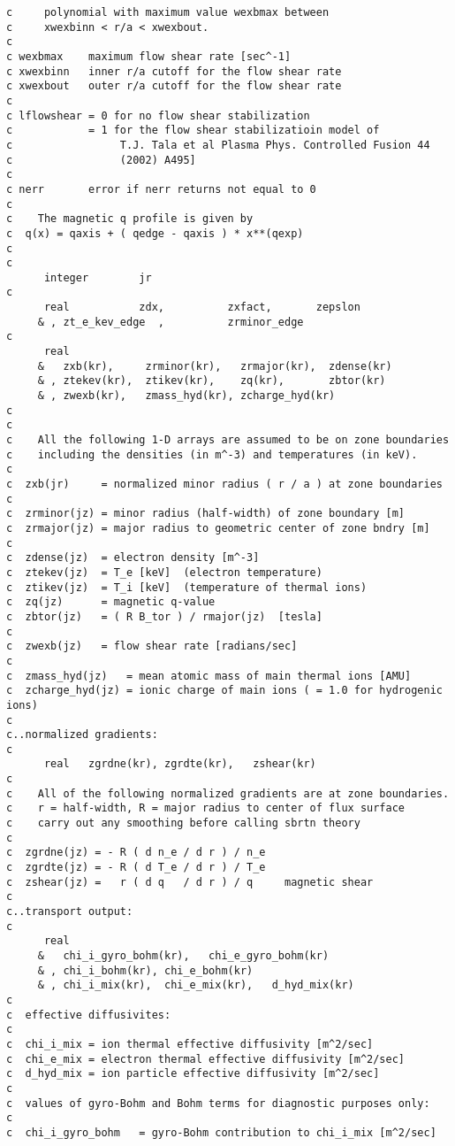 \begin{verbatim}
c     polynomial with maximum value wexbmax between
c     xwexbinn < r/a < xwexbout.
c
c wexbmax    maximum flow shear rate [sec^-1]
c xwexbinn   inner r/a cutoff for the flow shear rate
c xwexbout   outer r/a cutoff for the flow shear rate
c
c lflowshear = 0 for no flow shear stabilization
c            = 1 for the flow shear stabilizatioin model of
c                 T.J. Tala et al Plasma Phys. Controlled Fusion 44
c                 (2002) A495]
c
c nerr       error if nerr returns not equal to 0
c
c    The magnetic q profile is given by
c  q(x) = qaxis + ( qedge - qaxis ) * x**(qexp)
c
c
      integer        jr
c
      real           zdx,          zxfact,       zepslon
     & , zt_e_kev_edge  ,          zrminor_edge
c
      real
     &   zxb(kr),     zrminor(kr),   zrmajor(kr),  zdense(kr)
     & , ztekev(kr),  ztikev(kr),    zq(kr),       zbtor(kr)
     & , zwexb(kr),   zmass_hyd(kr), zcharge_hyd(kr)
c
c
c    All the following 1-D arrays are assumed to be on zone boundaries
c    including the densities (in m^-3) and temperatures (in keV).
c
c  zxb(jr)     = normalized minor radius ( r / a ) at zone boundaries
c
c  zrminor(jz) = minor radius (half-width) of zone boundary [m]
c  zrmajor(jz) = major radius to geometric center of zone bndry [m]
c
c  zdense(jz)  = electron density [m^-3]
c  ztekev(jz)  = T_e [keV]  (electron temperature)
c  ztikev(jz)  = T_i [keV]  (temperature of thermal ions)
c  zq(jz)      = magnetic q-value
c  zbtor(jz)   = ( R B_tor ) / rmajor(jz)  [tesla]
c
c  zwexb(jz)   = flow shear rate [radians/sec]
c
c  zmass_hyd(jz)   = mean atomic mass of main thermal ions [AMU]
c  zcharge_hyd(jz) = ionic charge of main ions ( = 1.0 for hydrogenic ions)
c
c..normalized gradients:
c
      real   zgrdne(kr), zgrdte(kr),   zshear(kr)
c
c    All of the following normalized gradients are at zone boundaries.
c    r = half-width, R = major radius to center of flux surface
c    carry out any smoothing before calling sbrtn theory
c
c  zgrdne(jz) = - R ( d n_e / d r ) / n_e
c  zgrdte(jz) = - R ( d T_e / d r ) / T_e
c  zshear(jz) =   r ( d q   / d r ) / q     magnetic shear
c
c..transport output:
c
      real
     &   chi_i_gyro_bohm(kr),   chi_e_gyro_bohm(kr)
     & , chi_i_bohm(kr), chi_e_bohm(kr)
     & , chi_i_mix(kr),  chi_e_mix(kr),   d_hyd_mix(kr)
c
c  effective diffusivites:
c
c  chi_i_mix = ion thermal effective diffusivity [m^2/sec]
c  chi_e_mix = electron thermal effective diffusivity [m^2/sec]
c  d_hyd_mix = ion particle effective diffusivity [m^2/sec]
c
c  values of gyro-Bohm and Bohm terms for diagnostic purposes only:
c
c  chi_i_gyro_bohm   = gyro-Bohm contribution to chi_i_mix [m^2/sec]

\end{verbatim}

